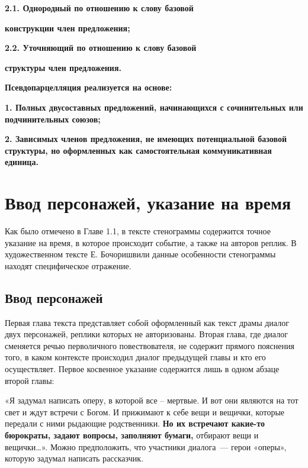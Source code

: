 \documentclass{kursa4}
\begin{document}
{      {\bfseries\color[rgb]{0.2,0.2,0.2}
      \textmd{2.1. Однородный по отношению к слову базовой}}

      {\bfseries\color[rgb]{0.2,0.2,0.2}
      \textmd{конструкции член предложения;}}

      {\bfseries\color[rgb]{0.2,0.2,0.2}
      \textmd{2.2. Уточняющий по отношению к слову базовой}}

      {\bfseries\color[rgb]{0.2,0.2,0.2}
      \textmd{структуры член предложения.}}

      {\bfseries\color[rgb]{0.2,0.2,0.2}
      \textmd{}Псевдопарцелляция\textmd{ реализуется на основе:}}

      {\bfseries\color[rgb]{0.2,0.2,0.2}
      \textmd{1. }\textmd{Полных двусоставных п}\textmd{редложений, начинающихся с сочинительных или подчинительных союзов;}}

      {\bfseries\color[rgb]{0.2,0.2,0.2}
      \textmd{2. }\textmd{Зависимых членов предложения, }\textmd{не имеющих потенциальной базовой структуры, }\textmd{но оформленных как самостоятельная коммуникативная единица. }}




    \section{Ввод персонажей, указание на время}   
      Как было отмечено в Главе 1.1, в тексте стенограммы содержится точное указание на время, в которое происходит событие, а также на авторов реплик. В художественном тексте Е. Бочоришвили данные особенности стенограммы находят специфическое отражение. 

      \subsection{Ввод персонажей}

        Первая глава текста    представляет собой    оформленный как текст драмы  диалог двух персонажей, реплики которых не авторизованы.   Вторая глава,   где диалог сменяется речью перволичного повествователя, не содержит прямого пояснения того, в каком контексте происходил диалог предыдущей главы и кто его осуществляет.    Первое  косвенное  указание содержится   лишь  в одном абзаце второй главы:  

        «Я задумал написать оперу, в которой все – мертвые. И вот они являются на тот свет и ждут встречи с Богом. И прижимают к себе вещи и вещички, которые передали с ними рыдающие родственники. \textbf{Но их встречают какие-то бюрократы, задают вопросы, заполняют бумаги,}
        отбирают вещи и вещички…». Можно предположить, что участники диалога~--- герои «оперы», которую задумал написать рассказчик. 

}
\end{document}
